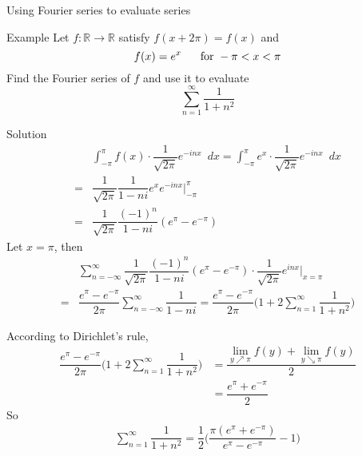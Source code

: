 \documentclass{beamer}
\begin{document}
\begin{frame}
\begin{block}{Using Fourier series to evaluate series}

\end{block}
\begin{block}{Example}
Let $f:\mathbb{R}\rightarrow\mathbb{R}$ satisfy $f(x+2\pi)=f(x)$ and
$$f(x)=e^x\hspace{6mm}\text{for }-\pi<x<\pi$$
Find the Fourier series of $f$ and use it to evaluate
$$\sum\limits_{n=1}^{\infty}\dfrac{1}{1+n^2}$$
\end{block}
\end{frame}
\begin{frame}
\begin{block}{Solution}
\begin{align*}
&\int_{-\pi}^{\pi}f(x)\cdot\dfrac{1}{\sqrt{2\pi}}e^{-inx}\,\,\, dx=\int_{-\pi}^{\pi}e^x\cdot\dfrac{1}{\sqrt{2\pi}}e^{-inx}\,\,\, dx\\
=&\dfrac{1}{\sqrt{2\pi}}\dfrac{1}{1-ni}e^xe^{-inx}\Big|_{-\pi}^{\pi}\\
=&\dfrac{1}{\sqrt{2\pi}}\dfrac{(-1)^n}{1-ni}(e^{\pi}-e^{-\pi})
\end{align*}
Let $x=\pi$, then
\begin{align*}
&\sum\limits_{n=-\infty}^{\infty}\dfrac{1}{\sqrt{2\pi}}\dfrac{(-1)^n}{1-ni}(e^{\pi}-e^{-\pi})\cdot \dfrac{1}{\sqrt{2\pi}}e^{inx}\Big|_{x=\pi}\\
=&\dfrac{e^{\pi}-e^{-\pi}}{2\pi}\sum\limits_{n=-\infty}^{\infty}\dfrac{1}{1-ni}=\dfrac{e^{\pi}-e^{-\pi}}{2\pi}\Big(1+2\sum\limits_{n=1}^{\infty}\dfrac{1}{1+n^2}\Big)
\end{align*}
\end{block}
\end{frame}
\begin{frame}
\begin{block}{}
According to Dirichlet's rule,
\begin{align*}
\dfrac{e^{\pi}-e^{-\pi}}{2\pi}\Big(1+2\sum\limits_{n=1}^{\infty}\dfrac{1}{1+n^2}\Big)&=\dfrac{\lim\limits_{y\nearrow \pi}f(y)+\lim\limits_{y\searrow \pi}f(y)}{2}\\
&=\dfrac{e^{\pi}+e^{-\pi}}{2}
\end{align*}
So
\begin{align*}
\sum\limits_{n=1}^{\infty}\dfrac{1}{1+n^2}=\dfrac{1}{2}\Big(\dfrac{\pi(e^{\pi}+e^{-\pi})}{e^{\pi}-e^{-\pi}}-1\Big)
\end{align*}
\end{block}
\end{frame}
\end{document}
